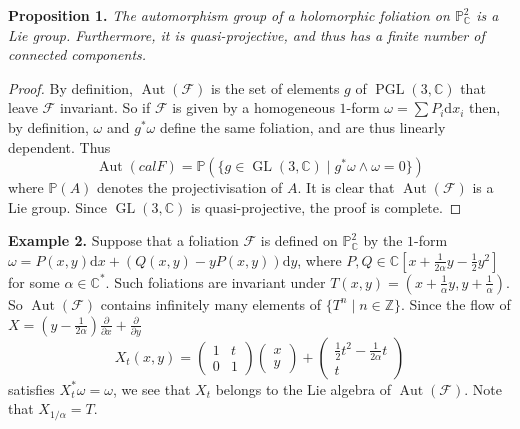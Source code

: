 \documentclass[british]{article}
\newenvironment{itenv}[1]
  {\phantomsection\par\smallskip\noindent\textbf{#1.}\itshape}
  {\par\smallskip}
\newenvironment{rmenv}[1]
  {\phantomsection\par\smallskip\noindent\textbf{#1.}\rmfamily}
  {\par\smallskip}
\newcommand{\oldpage}[1]{\marginpar{\footnotesize$\Big\vert$ \textit{p.~#1}}}
\begin{document}
\oldpage{51}

\protect{}\label{proposition-1}
\begin{itenv}{Proposition 1}
The automorphism group of a holomorphic foliation on
\(\mathbb{P}_\mathbb{C}^2\) is a Lie group. Furthermore, it is
quasi-projective, and thus has a finite number of connected components.

\end{itenv}

\begin{proof}
By definition, \(\operatorname{Aut}({\mathcal{F}})\) is the set of
elements \(g\) of \(\operatorname{PGL}(3,\mathbb{C})\) that leave
\({\mathcal{F}}\) invariant. So if \({\mathcal{F}}\) is given by a
homogeneous \(1\)-form \(\omega=\sum P_i\mathrm{d}{x}_i\) then, by
definition, \(\omega\) and \(g^*\omega\) define the same foliation, and
are thus linearly dependent. Thus \[
  \operatorname{Aut}(cal{F})
  = \mathbb{P}(\{ g\in\operatorname{GL}(3,\mathbb{C}) \mid g^*\omega\wedge\omega = 0 \})
\] where \(\mathbb{P}(A)\) denotes the projectivisation of \(A\). It is
clear that \(\operatorname{Aut}({\mathcal{F}})\) is a Lie group. Since
\(\operatorname{GL}(3,\mathbb{C})\) is quasi-projective, the proof is
complete.
\end{proof}

\protect{}\label{example-2}
\begin{rmenv}{Example 2}
Suppose that a foliation \({\mathcal{F}}\) is defined on
\(\mathbb{P}_\mathbb{C}^2\) by the \(1\)-form
\(\omega=P(x,y)\mathrm{d}{x}+(Q(x,y)-yP(x,y))\mathrm{d}{y}\), where
\(P,Q\in\mathbb{C}[x+\frac{1}{2\alpha}y-\frac{1}{2}y^2]\) for some
\(\alpha\in\mathbb{C}^*\). Such foliations are invariant under
\(T(x,y)=(x+\frac{1}{\alpha}y,y+\frac{1}{\alpha})\). So
\(\operatorname{Aut}({\mathcal{F}})\) contains infinitely many elements
of \(\{T^n\mid n\in\mathbb{Z}\}\). Since the flow of
\(X=(y-\frac{1}{2\alpha})\frac{\partial}{\partial x}+\frac{\partial}{\partial y}\)
\[
  X_t(x,y)
  = \left(\begin{smallmatrix}1&t\\0&1\end{smallmatrix}\right)\left(\begin{smallmatrix}x\\y\end{smallmatrix}\right) + \left(\begin{smallmatrix}\frac{1}{2}t^2-\frac{1}{2\alpha}t\\t\end{smallmatrix}\right)
\] satisfies \(X_t^*\omega=\omega\), we see that \(X_t\) belongs to the
Lie algebra of \(\operatorname{Aut}({\mathcal{F}})\). Note that
\(X_{1/\alpha}=T\).

\end{rmenv}
\end{document}
